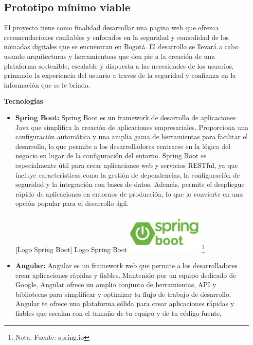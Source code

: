 \subsection{Prototipo mínimo viable}
El proyecto tiene como finalidad desarrollar una pagina web que ofrezca recomendaciones confiables y enfocados en la seguridad y comodidad de los nómadas digitales que se encuentran en Bogotá. El desarrollo se llevará a cabo usando arquitecturas y herramientoas que den pie a la creación de
una plataforma sostenible, escalable y dispuesta a las necesidades de los usuarios, primando la experiencia del usuario a traves de la seguridad y confianza en la información que se le brinda.

\textbf{Tecnologías}
\begin{itemize}
    \item \textbf{Spring Boot: } Spring Boot es un framework de desarrollo de aplicaciones Java que simplifica la creación de aplicaciones empresariales. Proporciona una configuración automática y una amplia gama de herramientas para facilitar el desarrollo, lo que permite a los desarrolladores centrarse en la lógica del negocio en lugar de la configuración del entorno.
    Spring Boot es especialmente útil para crear aplicaciones web y servicios RESTful, ya que incluye características como la gestión de dependencias, la configuración de seguridad y la integración con bases de datos. Además, permite el despliegue rápido de aplicaciones en entornos de producción, lo que lo convierte en una opción popular para el desarrollo ágil.
    \vspace{2mm}
    \begin{minipage}{0.9\textwidth}
        \centering
        [{Logo Spring Boot}]{ Logo Spring Boot  }
        \label{Firestore}
         \includegraphics[width=0.3\textwidth]{Content/Images/spring-boot-logo.png}
        \footnote{Nota. \textup{Fuente: spring.io}}
    \end{minipage}

    \item \textbf{Angular: } Angular es un framework web que permite a los desarrolladores crear aplicaciones rápidas y fiables.
    Mantenido por un equipo dedicado de Google, Angular ofrece un amplio conjunto de herramientas, API y bibliotecas para simplificar y optimizar tu flujo de trabajo de desarrollo. Angular te ofrece una plataforma sólida para crear aplicaciones rápidas y fiables que escalan con el tamaño de tu equipo y de tu código fuente.


\end{itemize}
